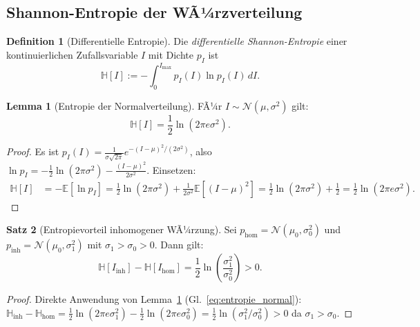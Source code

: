 ﻿\documentclass[12pt,a4paper]{article}
\theoremstyle{definition}
\newtheorem{definition}{Definition}[section]
\newtheorem{theorem}{Satz}[section]
\newtheorem{lemma}[theorem]{Lemma}
\newcommand{\E}{\mathbb{E}}
\newcommand{\N}{\mathcal{N}}
\begin{document}
\subsection{Shannon-Entropie der WÃ¼rzverteilung}

\begin{definition}[Differentielle Entropie]
Die \emph{differentielle Shannon-Entropie} einer kontinuierlichen
Zufallsvariable $I$ mit Dichte $p_I$ ist
\begin{equation}
  \mathbb{H}[I] := -\int_0^{I_{\max}} p_I(I) \ln p_I(I)\, dI.
\end{equation}
\end{definition}

\begin{lemma}[Entropie der Normalverteilung]\label{lem:entrop_norm}
FÃ¼r $I \sim \mathcal{N}(\mu, \sigma^2)$ gilt:
\begin{equation}
  \mathbb{H}[I] = \frac{1}{2}\ln(2\pi e \sigma^2).
  \label{eq:entropie_normal}
\end{equation}
\end{lemma}

\begin{proof}
Es ist
$p_I(I) = \tfrac{1}{\sigma\sqrt{2\pi}} e^{-(I-\mu)^2/(2\sigma^2)}$,
also $\ln p_I = -\tfrac{1}{2}\ln(2\pi\sigma^2) - \tfrac{(I-\mu)^2}{2\sigma^2}$.
Einsetzen:
\begin{align*}
  \mathbb{H}[I] &= -\E[\ln p_I]
  = \tfrac{1}{2}\ln(2\pi\sigma^2) + \tfrac{1}{2\sigma^2}\E[(I-\mu)^2]
  = \tfrac{1}{2}\ln(2\pi\sigma^2) + \tfrac{1}{2}
  = \tfrac{1}{2}\ln(2\pi e\sigma^2).
\end{align*}
\end{proof}

\begin{theorem}[Entropievorteil inhomogener WÃ¼rzung]\label{thm:entropie}
Sei $p_{\mathrm{hom}} = \N(\mu_0, \sigma_0^2)$ und
$p_{\mathrm{inh}} = \N(\mu_0, \sigma_1^2)$ mit $\sigma_1 > \sigma_0 > 0$.
Dann gilt:
\[
  \mathbb{H}[I_{\mathrm{inh}}] - \mathbb{H}[I_{\mathrm{hom}}]
  = \frac{1}{2}\ln\!\left(\frac{\sigma_1^2}{\sigma_0^2}\right) > 0.
\]
\end{theorem}

\begin{proof}
Direkte Anwendung von Lemma~\ref{lem:entrop_norm}
(Gl.~\ref{eq:entropie_normal}):
$\mathbb{H}_{\mathrm{inh}} - \mathbb{H}_{\mathrm{hom}}
= \tfrac{1}{2}\ln(2\pi e\sigma_1^2) - \tfrac{1}{2}\ln(2\pi e\sigma_0^2)
= \tfrac{1}{2}\ln(\sigma_1^2/\sigma_0^2) > 0$
da $\sigma_1 > \sigma_0$.
\end{proof}
\end{document}
